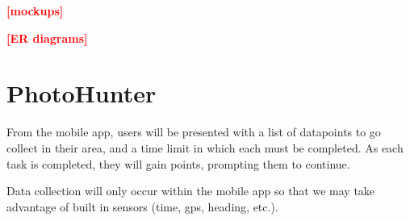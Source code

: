 \documentclass[aspectratio=169]{beamer}
\newcommand{\todo}[1]{\textcolor{red}{\textbf{[#1]}}}
\begin{document}
\begin{frame}
  \todo{mockups}
\end{frame}

\begin{frame}
  \todo{ER diagrams}
\end{frame}

\section{PhotoHunter}

\begin{frame}
  From the mobile app, users will be presented with a list of
  datapoints
  to go collect in their area, and a time limit in which each must be
  completed. As each task is completed, they will gain points,
  prompting
  them to continue.

  Data collection will only occur within the mobile app so that we may
  take advantage of built in sensors (time, gps, heading, etc.).
\end{frame}
\end{document}
